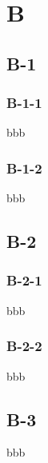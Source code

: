 \chapter{B}
\section{B-1}
\subsection{B-1-1}
bbb

\subsection{B-1-2}
bbb

\section{B-2}
\subsection{B-2-1}
bbb

\subsection{B-2-2}
bbb

\section{B-3}
bbb